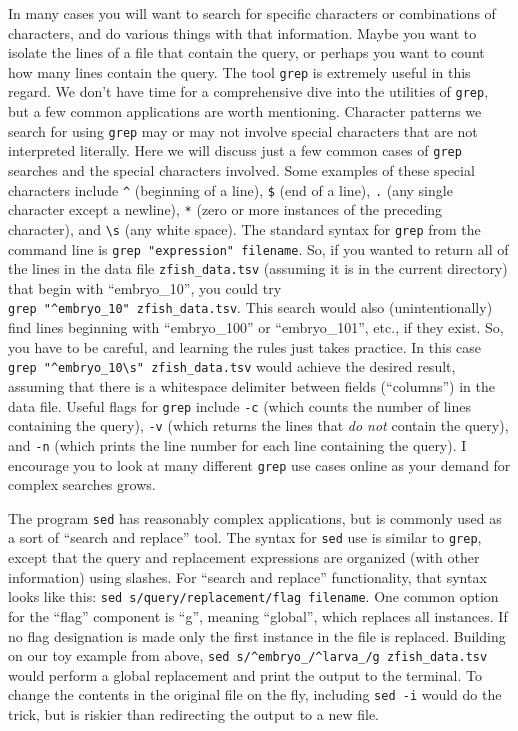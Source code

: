 \documentclass[]{book}
\begin{document}
In many cases you will want to search for specific characters or combinations of characters, and do various things with that information. Maybe you want to isolate the lines of a file that contain the query, or perhaps you want to count how many lines contain the query. The tool \texttt{grep} is extremely useful in this regard. We don't have time for a comprehensive dive into the utilities of \texttt{grep}, but a few common applications are worth mentioning. Character patterns we search for using \texttt{grep} may or may not involve special characters that are not interpreted literally. Here we will discuss just a few common cases of \texttt{grep} searches and the special characters involved. Some examples of these special characters include \texttt{\^{}} (beginning of a line), \texttt{\$} (end of a line), \texttt{.} (any single character except a newline), \texttt{*} (zero or more instances of the preceding character), and \texttt{\textbackslash{}s} (any white space). The standard syntax for \texttt{grep} from the command line is \texttt{grep\ "expression"\ filename}. So, if you wanted to return all of the lines in the data file \texttt{zfish\_data.tsv} (assuming it is in the current directory) that begin with ``embryo\_10'', you could try \texttt{grep\ "\^{}embryo\_10"\ zfish\_data.tsv}. This search would also (unintentionally) find lines beginning with ``embryo\_100'' or ``embryo\_101'', etc., if they exist. So, you have to be careful, and learning the rules just takes practice. In this case \texttt{grep\ "\^{}embryo\_10\textbackslash{}s"\ zfish\_data.tsv} would achieve the desired result, assuming that there is a whitespace delimiter between fields (``columns'') in the data file. Useful flags for \texttt{grep} include \texttt{-c} (which counts the number of lines containing the query), \texttt{-v} (which returns the lines that \emph{do not} contain the query), and \texttt{-n} (which prints the line number for each line containing the query). I encourage you to look at many different \texttt{grep} use cases online as your demand for complex searches grows.

The program \texttt{sed} has reasonably complex applications, but is commonly used as a sort of ``search and replace'' tool. The syntax for \texttt{sed} use is similar to \texttt{grep}, except that the query and replacement expressions are organized (with other information) using slashes. For ``search and replace'' functionality, that syntax looks like this: \texttt{sed\ \textquotesingle{}s/query/replacement/flag\textquotesingle{}\ filename}. One common option for the ``flag'' component is ``g'', meaning ``global'', which replaces all instances. If no flag designation is made only the first instance in the file is replaced. Building on our toy example from above, \texttt{sed\ \textquotesingle{}s/\^{}embryo\_/\^{}larva\_/g\textquotesingle{}\ zfish\_data.tsv} would perform a global replacement and print the output to the terminal. To change the contents in the original file on the fly, including \texttt{sed\ -i} would do the trick, but is riskier than redirecting the output to a new file.
\end{document}
